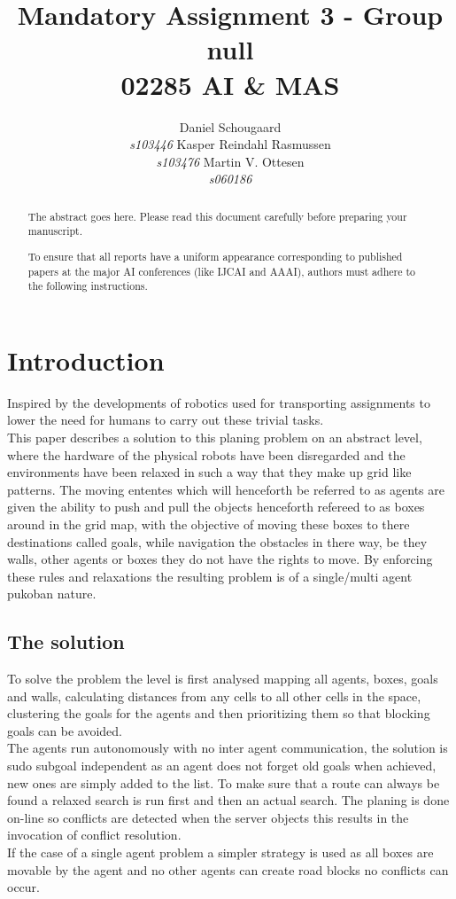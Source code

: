 \documentclass[letterpaper]{article}
\begin{document}
\title{Mandatory Assignment 3 - Group null\\ 02285 AI \& MAS}
\author{Daniel Schougaard \\ \textit{s103446} \And Kasper Reindahl Rasmussen\\ \textit{s103476} \And Martin V. Ottesen\\ \textit{s060186}}
\maketitle

\begin{abstract}
The abstract goes here. Please read this document carefully before preparing your manuscript.

To ensure that all reports have a uniform appearance corresponding to published papers at the major AI conferences (like IJCAI and AAAI), authors must adhere to the following instructions. 
\end{abstract}

\section{Introduction}
	Inspired by the developments of robotics used for transporting assignments to lower the need for humans to carry out these trivial tasks.\\ This paper describes a solution to this planing problem on an abstract level, where the hardware of the physical robots have been disregarded and the environments have been relaxed in such a way that they make up grid like patterns. The  moving ententes which will henceforth be referred to as agents are given the ability to push and pull the objects henceforth refereed to as boxes around in the grid map, with the objective of moving these boxes to there destinations called goals, while navigation the obstacles in there way, be they walls, other agents or boxes they do not have the rights to move. By enforcing these rules and relaxations the resulting problem is of a single/multi agent pukoban nature. 
	\subsection{The solution}
		To solve the problem the level is first analysed mapping all agents, boxes, goals and walls, calculating distances from any cells to all other cells in the space, clustering the goals for the agents and then prioritizing them so that blocking goals can be avoided.\\
		The agents run autonomously with no inter agent communication, the solution is sudo subgoal independent as an agent does not forget old goals when achieved, new ones are simply added to the list. To make sure that a route can always be found a relaxed search is run first and then an actual search. The planing is done on-line so conflicts are detected when the server objects this results in the invocation of conflict resolution.\\
		If the case of a single agent problem a simpler strategy is used as all boxes are movable by the agent and no other agents can create road blocks no conflicts can occur.
\end{document}

